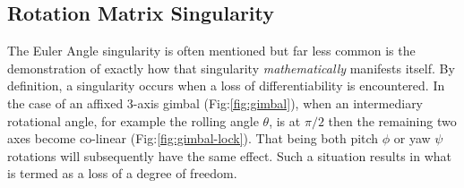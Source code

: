 \subsection{Rotation Matrix Singularity}\label{subsec:dynamics.rigidbody.singularity}
The Euler Angle singularity is often mentioned but far less common is the demonstration of exactly how that singularity \emph{mathematically} manifests itself. By definition, a singularity occurs when a loss of differentiability is encountered. In the case of an affixed 3-axis gimbal (Fig:\ref{fig:gimbal}), when an intermediary rotational angle, for example the rolling angle $\theta$, is at $\pi/2$ then the remaining two axes become co-linear (Fig:\ref{fig:gimbal-lock}). That being both pitch $\phi$ or yaw $\psi$ rotations will subsequently have the same effect. Such a situation results in what is termed as a loss of a degree of freedom.
